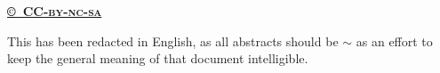 
\href{https://creativecommons.org/licenses/by-nc-sa/4.0/}{\textbf{©~CC\textsc{-by-nc-sa}}}\par This has been redacted in English, as all abstracts should be $\sim$ as an effort to keep the general meaning of that document intelligible.
